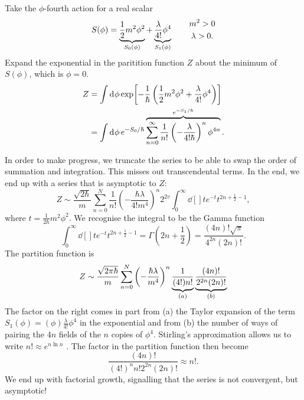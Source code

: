 Take the $\phi$-fourth action for a real scalar
\begin{equation}
  S(\phi) = \underbrace{\frac{1}{2} m^2 \phi^2}_{\mathclap{S_0(\phi)}} + \underbrace{\frac{\lambda}{4!} \phi^4}_{\mathclap{S_1(\phi)}} \qquad 
  \begin{gathered}
    m^2 > 0 \\
    \lambda > 0.
  \end{gathered}
\end{equation}
Expand the exponential in the paritition function $Z$ about the minimum of $S(\phi)$, which is $\phi = 0$.
\begin{align}
  Z &= \int \dd[]{\phi} \exp[-\frac{1}{\hbar} \left( \frac{1}{2} m^2\phi^2 + \frac{\lambda}{4!}\phi^4 \right)]  \\
    &= \int \dd[]{\phi} e^{-S_0 / \hbar} \overbrace{\sum_{n=0}^\infty \frac{1}{n!} \left( -\frac{\lambda}{4! \hbar} \right)^n \phi^{4 n}}^{\mathclap{e^{- S_1 / \hbar}}}.
\end{align}

In order to make progress, we truncate the series to be able to swap the order of summation and integration. This misses out transcendental terms.
In the end, we end up with a series that is asymptotic to $Z$:
 \begin{equation}
   Z \sim \frac{\sqrt{2\hbar}}{m} \sum_{n=0}^N \frac{1}{n!} \left( - \frac{\hbar \lambda}{4! m^4} \right)^n 2^{2v} \int_{0}^\infty \dd[]{t} e^{-t} t^{2n + \frac{1}{2} - 1}, 
\end{equation}
where $t = \frac{1}{2\hbar} m^2 \phi^2$. We recognise the integral to be the Gamma function
\begin{equation}
  \int_{0}^\infty \dd[]{t} e^{-t} t^{2n + \frac{1}{2} - 1} = \Gamma(2 n + \frac{1}{2}) = \frac{(4n)! \sqrt{\pi}}{4^{2n} (2n)!}.
\end{equation}
The partition function is
\begin{equation}
  \label{eq:3-Z0}
  Z \sim \frac{\sqrt{2 \pi \hbar}}{m} \sum_{n=0}^N \left( - \frac{\hbar \lambda}{m^4} \right)^n \underbrace{\frac{1}{(4!) n!}}_{\mathclap{(a)}}\underbrace{\frac{(4n)!}{2^{2n} (2n)!}}_{\mathclap{(b)}}
\end{equation}
The factor on the right comes in part from (a) the Taylor expansion of the term $S_1(\phi) = (\phi)\frac{\lambda}{4!} \phi^4$ in the exponential and from (b) the number of ways of pairing the $4n$ fields of the $n$ copies of $\phi^4$.
Stirling's approximation allows us to write $n! \approx e^{n \ln n}$ .
The factor in the partition function then become
\begin{equation}
  \frac{(4n)!}{(4!)^n n! 2^{2n} (2n)!} \approx n!.
\end{equation}
We end up with factorial growth, signalling that the series is not convergent, but asymptotic!

